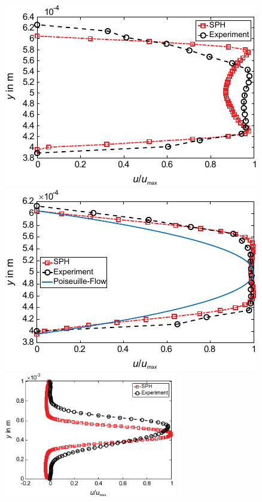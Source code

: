\begin{figure}[htpb]
	\centering
	 {\includegraphics[width=0.48\columnwidth]{bilder/wieth_2016_2_6}}\hfill
	 {\includegraphics[width=0.48\columnwidth]{bilder/wieth_2016_3_6}}\hfill
	 {\includegraphics[width=0.48\columnwidth,height=5.5cm]{bilder/wieth_2016_5_6}}\hfill

\end{figure}
